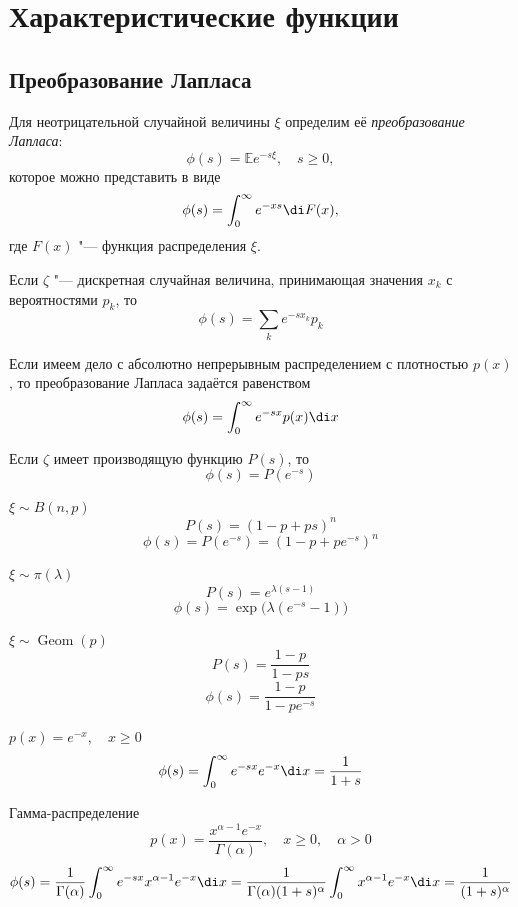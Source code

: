 \chapter{Характеристические функции}

\section{Преобразование Лапласа}

\begin{definition}
    Для неотрицательной случайной величины $ \xi $ определим её \emph{преобразование Лапласа}:
    $$ \phi(s) = \mathbb E e^{-s\xi}, \quad s \ge 0, $$
    которое можно представить в виде
    $$ \phi(s) = \int_0^\infty e^{-xs} \di F(x), $$
    где $ F(x) $ "--- функция распределения $ \xi $.
\end{definition}
Если $ \zeta $ "--- дискретная случайная величина, принимающая значения $ x_k $ с вероятностями
$ p_k $, то
$$ \phi(s) = \sum_k e^{-sx_k}p_k $$

Если имеем дело с абсолютно непрерывным распределением с плотностью $ p(x) $, то преобразование
Лапласа задаётся равенством
$$ \phi(s) = \int_0^\infty e^{-sx}p(x) \di x $$

Если $ \zeta $ имеет производящую функцию $ P(s) $, то
$$ \phi(s) = P(e^{-s}) $$

\begin{exmpls}
    \item $ \xi \sim B(n, p) $
        $$ P(s) = (1 - p + ps)^n $$
        $$ \phi(s) = P(e^{-s}) = (1 - p + pe^{-s})^n $$
    \item $ \xi \sim \pi(\lambda) $
        $$ P(s) = e^{\lambda(s - 1)} $$
        $$ \phi(s) = \exp \bigl( \lambda(e^{-s} - 1) \bigr) $$
    \item $ \xi \sim \operatorname{Geom}(p) $
        $$ P(s) = \frac{1 - p}{1 - ps} $$
        $$ \phi(s) = \frac{1 - p}{1 - pe^{-s}} $$
    \item $ p(x) = e^{-x}, \quad x \ge 0 $
        $$ \phi(s) = \int_0^\infty e^{-sx} e^{-x} \di x = \frac1{1 + s} $$
    \item Гамма-распределение
        $$ p(x) = \frac{x^{\alpha - 1}e^{-x}}{\Gamma(\alpha)}, \quad x \ge 0, \quad \alpha > 0 $$
        $$ \phi(s) = \frac1{\Gamma(\alpha)} \int_0^\infty e^{-sx}x^{\alpha - 1} e^{-x} \di x =
        \frac1{\Gamma(\alpha)(1 + s)^\alpha} \int_0^\infty x^{\alpha - 1}e^{-x} \di x =
        \frac1{(1 + s)^\alpha} $$
\end{exmpls}

